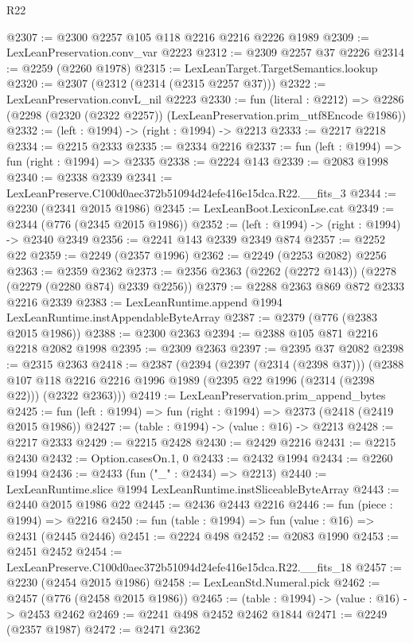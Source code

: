 \begin{lexlean}{R22}
\begin{coremodule}
@2307 := @2300 @2257 @105 @118 @2216 @2216 @2226 @1989
@2309 := LexLeanPreservation.conv_var @2223
@2312 := @2309 @2257 @37 @2226
@2314 := @2259 (@2260 @1978)
@2315 := LexLeanTarget.TargetSemantics.lookup
@2320 := @2307 (@2312 (@2314 (@2315 @2257 @37)))
@2322 := LexLeanPreservation.convL_nil @2223
@2330 := fun (literal : @2212) =>
  @2286 (@2298 (@2320 (@2322 @2257)) (LexLeanPreservation.prim_utf8Encode @1986))
@2332 := (left : @1994) -> (right : @1994) -> @2213
@2333 := @2217 @2218
@2334 := @2215 @2333
@2335 := @2334 @2216
@2337 := fun (left : @1994) => fun (right : @1994) => @2335
@2338 := @2224 @143
@2339 := @2083 @1998
@2340 := @2338 @2339
@2341 := LexLeanPreserve.C100d0aec372b51094d24efe416e15dca.R22.__fits_3
@2344 := @2230 (@2341 @2015 @1986)
@2345 := LexLeanBoot.LexiconLse.cat
@2349 := @2344 (@776 (@2345 @2015 @1986))
@2352 := (left : @1994) -> (right : @1994) -> @2340 @2349
@2356 := @2241 @143 @2339 @2349 @874
@2357 := @2252 @22
@2359 := @2249 (@2357 @1996)
@2362 := @2249 (@2253 @2082) @2256
@2363 := @2359 @2362
@2373 := @2356 @2363 (@2262 (@2272 @143)) (@2278 (@2279 (@2280 @874) @2339 @2256))
@2379 := @2288 @2363 @869 @872 @2333 @2216 @2339
@2383 := LexLeanRuntime.append @1994 LexLeanRuntime.instAppendableByteArray
@2387 := @2379 (@776 (@2383 @2015 @1986))
@2388 := @2300 @2363
@2394 := @2388 @105 @871 @2216 @2218 @2082 @1998
@2395 := @2309 @2363
@2397 := @2395 @37 @2082
@2398 := @2315 @2363
@2418 := @2387
    (@2394
      (@2397 (@2314 (@2398 @37)))
      (@2388 @107 @118 @2216 @2216 @1996 @1989 (@2395 @22 @1996 (@2314 (@2398 @22))) (@2322 @2363)))
@2419 := LexLeanPreservation.prim_append_bytes
@2425 := fun (left : @1994) => fun (right : @1994) => @2373 (@2418 (@2419 @2015 @1986))
@2427 := (table : @1994) -> (value : @16) -> @2213
@2428 := @2217 @2333
@2429 := @2215 @2428
@2430 := @2429 @2216
@2431 := @2215 @2430
@2432 := Option.casesOn.{1, 0}
@2433 := @2432 @1994
@2434 := @2260 @1994
@2436 := @2433 (fun ("_" : @2434) => @2213)
@2440 := LexLeanRuntime.slice @1994 LexLeanRuntime.instSliceableByteArray
@2443 := @2440 @2015 @1986 @22
@2445 := @2436 @2443 @2216
@2446 := fun (piece : @1994) => @2216
@2450 := fun (table : @1994) => fun (value : @16) => @2431 (@2445 @2446)
@2451 := @2224 @498
@2452 := @2083 @1990
@2453 := @2451 @2452
@2454 := LexLeanPreserve.C100d0aec372b51094d24efe416e15dca.R22.__fits_18
@2457 := @2230 (@2454 @2015 @1986)
@2458 := LexLeanStd.Numeral.pick
@2462 := @2457 (@776 (@2458 @2015 @1986))
@2465 := (table : @1994) -> (value : @16) -> @2453 @2462
@2469 := @2241 @498 @2452 @2462 @1844
@2471 := @2249 (@2357 @1987)
@2472 := @2471 @2362

\end{coremodule}
\end{lexlean}
